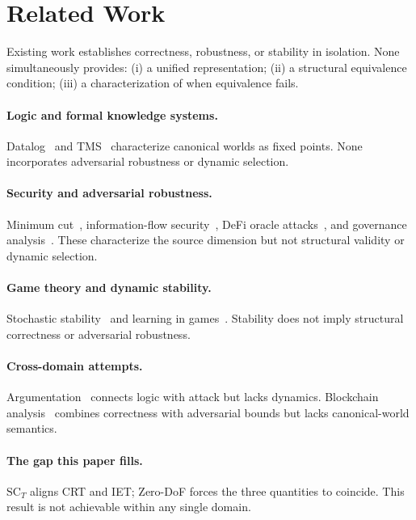 \section{Related Work}
\label{sec:related}

Existing work establishes correctness, robustness, or stability in isolation.
None simultaneously provides: (i) a unified representation; (ii) a structural equivalence condition;
(iii) a characterization of when equivalence fails.

\paragraph{Logic and formal knowledge systems.}
Datalog~\cite{ceri1989} and TMS~\cite{doyle1979,dekleer1987} characterize canonical worlds as fixed points.
None incorporates adversarial robustness or dynamic selection.

\paragraph{Security and adversarial robustness.}
Minimum cut~\cite{ford1962}, information-flow security~\cite{goguen1982,sabelfeld2003},
DeFi oracle attacks~\cite{lo2023,daian2020}, and governance analysis~\cite{fritsch2022}.
These characterize the source dimension but not structural validity or dynamic selection.

\paragraph{Game theory and dynamic stability.}
Stochastic stability~\cite{foster1990,young1993} and learning in games~\cite{fudenberg1998}.
Stability does not imply structural correctness or adversarial robustness.

\paragraph{Cross-domain attempts.}
Argumentation~\cite{dung1995} connects logic with attack but lacks dynamics.
Blockchain analysis~\cite{garay2015,pass2017} combines correctness with adversarial bounds
but lacks canonical-world semantics.

\paragraph{The gap this paper fills.}
$\mathrm{SC}_T$ aligns CRT and IET; Zero-DoF forces the three quantities to coincide.
This result is not achievable within any single domain.
